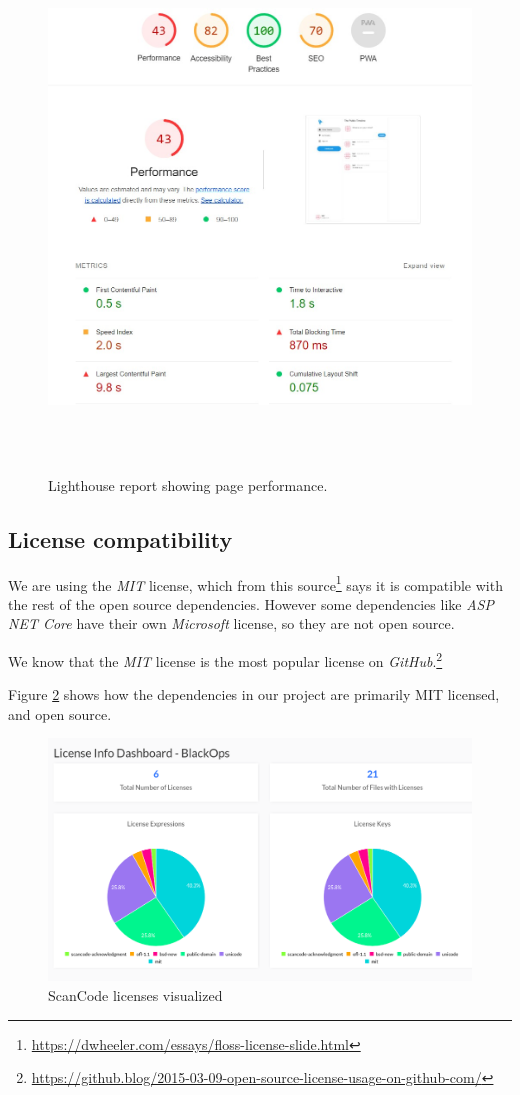 \begin{figure}[H]
    \centering
    \includegraphics[width=16cm,height=14cm,keepaspectratio]{Diagrams/lighthouse.jpg}
    \caption{Lighthouse report showing page performance.}
    \label{ComponentDiagram_1}
\end{figure}


\subsection{License compatibility}
We are using the \textit{MIT} license, which from this source\footnote{\url{https://dwheeler.com/essays/floss-license-slide.html}} says it is compatible with the rest of the open source dependencies. However some dependencies like \textit{ASP NET Core} have their own \textit{Microsoft} license, so they are not open source.

We know that the \textit{MIT} license is the most popular license on \textit{GitHub}.\footnote{\url{https://github.blog/2015-03-09-open-source-license-usage-on-github-com/}}

Figure \ref{fig:scancodelicenses} shows how the dependencies in our project are primarily MIT licensed, and open source.

\begin{figure}[H]
    \centering
    \includegraphics[width=16cm, keepaspectratio]{Diagrams/Scancode-licenses2.png}
    \caption{ScanCode licenses visualized}
    \label{fig:scancodelicenses}
\end{figure}
